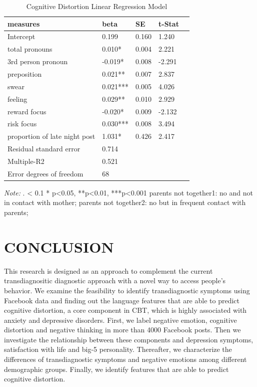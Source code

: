 \begin{table}%
\caption{Cognitive Distortion Linear Regression Model}
\label{tab:five}
\begin{minipage}{\columnwidth}
\begin{center}
\begin{tabular}{lllll}
  \toprule
        measures & beta	& SE   & t-Stat \\
  \hline
  \hline 
Intercept        &   0.199  &0.160 &  1.240  \\ 
total pronouns&  0.010* &  0.004 &  2.221 \\
3rd person pronoun  & -0.019*  & 0.008 & -2.291   \\
preposition   &  0.021**  & 0.007 &  2.837  \\
swear  &  0.021***  & 0.005 &  4.026\\
feeling   &  0.029**  & 0.010 &  2.929  \\
reward focus & -0.020*  & 0.009 & -2.132 \\
risk focus   &  0.030***  & 0.008 &  3.494 \\
proportion of late night post        &   1.031*  & 0.426 &  2.417 \\

  \hline
  Residual standard error &  0.714  \\
  Multiple-R2 &  0.521 \\ 
  Error degrees of freedom  & 68  \\ 
  \hline
  \bottomrule
\end{tabular}
\end{center}
\bigskip\centering

 \emph{Note:} . < 0.1 * p<0.05, **p<0.01, ***p<0.001 
parents not together1: no and not in contact with mother; parents not together2: no but in frequent contact with parents; 

\end{minipage}
\end{table}%

\section{CONCLUSION}
This research is designed as an approach to complement the current transdiagnositic diagnostic approach with a novel way to access people's behavior. We examine the feasibility to identify transdiagnostic symptoms using Facebook data and finding out the language features that are able to predict cognitive distortion, a core component in CBT, which is highly associated with anxiety and depressive disorders. First, we label negative emotion, cognitive distortion and negative thinking in more than 4000 Facebook posts. Then we investigate the relationship between these components and depression symptoms, satisfaction with life and big-5 personality. Thereafter, we characterize the differences of transdiagnostic symptoms and negative emotions among different demographic groups. Finally, we identify features that are able to predict cognitive distortion.

